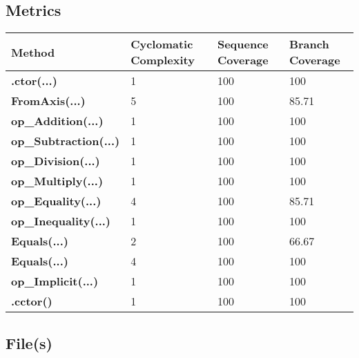 \documentclass[a4paper,10pt]{article}
\begin{document}
\subsection{Metrics}
\begin{longtable}[l]{|l|l|l|l|}
\hline
\textbf{Method} & \textbf{Cyclomatic Complexity} & \textbf{Sequence Coverage} & \textbf{Branch Coverage}\\
\hline
\textbf{.ctor(...)} & 1 & 100 & 100\\
\hline
\textbf{FromAxis(...)} & 5 & 100 & 85.71\\
\hline
\textbf{op\_Addition(...)} & 1 & 100 & 100\\
\hline
\textbf{op\_Subtraction(...)} & 1 & 100 & 100\\
\hline
\textbf{op\_Division(...)} & 1 & 100 & 100\\
\hline
\textbf{op\_Multiply(...)} & 1 & 100 & 100\\
\hline
\textbf{op\_Equality(...)} & 4 & 100 & 85.71\\
\hline
\textbf{op\_Inequality(...)} & 1 & 100 & 100\\
\hline
\textbf{Equals(...)} & 2 & 100 & 66.67\\
\hline
\textbf{Equals(...)} & 4 & 100 & 100\\
\hline
\textbf{op\_Implicit(...)} & 1 & 100 & 100\\
\hline
\textbf{.cctor()} & 1 & 100 & 100\\
\hline
\end{longtable}
\subsection{File(s)}
\end{document}
